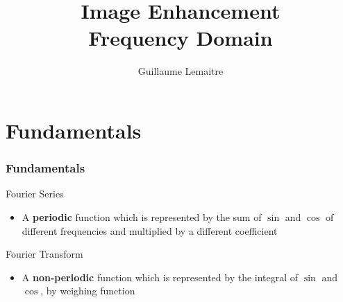 \documentclass{beamer}
\title{Image Enhancement\\
Frequency Domain}
\author{Guillaume Lemaitre}
\institute{Universit\'e de Bourgogne}
\begin{document}
\begin{frame}
  \titlepage
\end{frame}

\begin{frame}
  \tableofcontents[sectionstyle=show,subsectionstyle=show,subsubsectionstyle=hide]
\end{frame}

\section{Fundamentals}
\begin{frame}
\frametitle{Fundamentals}
\begin{block}{Fourier Series}
\begin{itemize}
	\item A \textbf{periodic} function which is represented by the sum of $\sin$ and $\cos$ of different frequencies and multiplied by a different coefficient	
\end{itemize}
\end{block}
\begin{block}{Fourier Transform}
\begin{itemize}
	\item A \textbf{non-periodic} function which is represented by the integral of $\sin$ and $\cos$, by weighing function
\end{itemize}
\end{block}
\end{frame}
\end{document}
